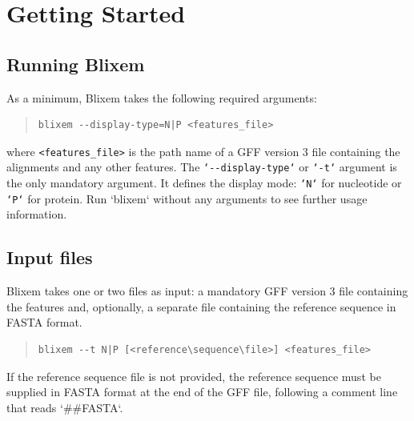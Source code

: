 \documentclass[letterpaper]{article}
\begin{document}
\clearpage
{\color[rgb]{0.0,0.27058825,0.5254902}\section[Getting Started]{Getting Started}}
\hypertarget{RefHeading1461056909880}{}
{\color[rgb]{0.30980393,0.5058824,0.7411765}\subsection[Running Blixem]{Running Blixem}}
\hypertarget{RefHeading1481056909880}{}{
As a minimum, Blixem takes the following required arguments:}
\begin{quote}
\begin{verbatim}
blixem --display-type=N|P <features_file>
\end{verbatim}
\end{quote}
{where \texttt{{\textless}features\_file{\textgreater}} is the path name of a GFF
version 3 file containing the alignments and any other features. The
 \texttt{{\textquoteleft}{}-{}-display-type{\textquoteleft}} or
\texttt{{\textquoteleft}{}-t{\textquoteleft}} argument is the only mandatory
argument. It defines the display mode:
\texttt{{\textquoteleft}N{\textquoteleft}} for nucleotide or
\texttt{{\textquoteleft}P{\textquoteleft}} for protein. 
Run {\textquoteleft}blixem{\textquoteleft} without any arguments to see
further usage information.}

{\color[rgb]{0.30980393,0.5058824,0.7411765}\subsection[Input files]{Input files}}
\hypertarget{RefHeading1501056909880}{}{
Blixem takes one or two files as input: a mandatory GFF version 3 file
containing the features and, optionally, a separate file containing the
reference sequence in FASTA format.}

\bigskip

\begin{quote}
\begin{verbatim}
blixem --t N|P [<reference\sequence\file>] <features_file>
\end{verbatim}
\end{quote}

{If the reference sequence file is not provided, the reference sequence
must be supplied in FASTA format at the end of the GFF file, following
a comment line that reads {\textquoteleft}\#\#FASTA{\textquoteleft}.}
\end{document}
